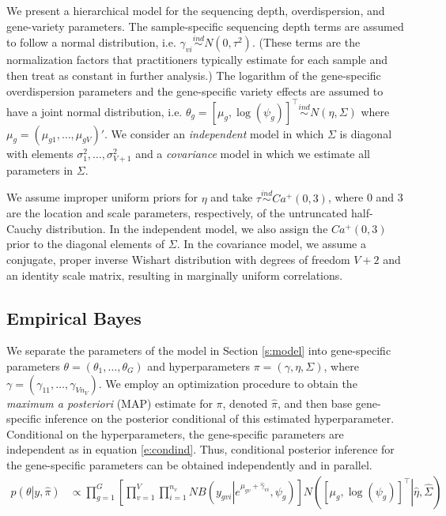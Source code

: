 \documentclass[useAMS,usenatbib,referee]{biom}
\begin{document}
We present a hierarchical model for the sequencing depth, overdispersion, and gene-variety parameters. The sample-specific sequencing depth terms are assumed to follow a normal distribution, i.e. $\gamma_{vi} \stackrel{ind}{\sim} N(0,\tau^2)$. (These terms are the normalization factors that practitioners typically estimate for each sample and then treat as constant in further analysis.) The logarithm of the gene-specific overdispersion parameters and the gene-specific variety effects are assumed to have a joint normal distribution, i.e. 
$\theta_g = [\mu_g, \log(\psi_g)]^\top \stackrel{ind}{\sim} N\left(\eta, \Sigma\right)$
where $\mu_g = (\mu_{g1},\ldots,\mu_{gV})'$. We consider an \emph{independent} model in which $\Sigma$ is diagonal with elements $\sigma_1^2,\ldots,\sigma_{V+1}^2$ and a \emph{covariance} model in which we estimate all parameters in $\Sigma$.

We assume improper uniform priors for $\eta$ and take $\tau\stackrel{ind}{\sim} Ca^+(0,3)$, where 0 and 3 are the location and scale parameters, respectively, of the untruncated half-Cauchy distribution. In the independent model, we also assign the $Ca^+(0,3)$ prior to the diagonal elements of $\Sigma$. In the covariance model, we assume a conjugate, proper inverse Wishart distribution with degrees of freedom $V+2$ and an identity scale matrix, resulting in marginally uniform correlations. 

\subsection{Empirical Bayes}
\label{s:ebayes}

We separate the parameters of the model in Section \ref{s:model} into gene-specific parameters $\theta = (\theta_1,\ldots,\theta_G)$ and hyperparameters $\pi = (\gamma,\eta, \Sigma)$, where $\gamma = (\gamma_{11},\ldots,\gamma_{Vn_V})$. We employ an optimization procedure to obtain the \emph{maximum a posteriori} (MAP) estimate for $\pi$, denoted $\hat{\pi}$, and then base gene-specific inference on the posterior conditional of this estimated hyperparameter. Conditional on the hyperparameters, the gene-specific parameters are independent as in equation \eqref{e:condind}. Thus, conditional posterior inference for the gene-specific parameters can be obtained independently and in parallel.
\begin{align}
p\left(\theta\left|y,\hat{\pi}\right.\right) 
&\propto \prod_{g=1}^G \left[ \prod_{v=1}^V \prod_{i=1}^{n_v} NB\left(y_{gvi}\left|e^{\mu_{gv}+\hat{\gamma}_{vi}},\psi_g\right.\right) \right] N\left(\left.\left[\mu_g, \log(\psi_g) \right]^\top\right|\hat{\eta}, \hat{\Sigma} \right) 
\label{e:condind}
\end{align}
\end{document}
